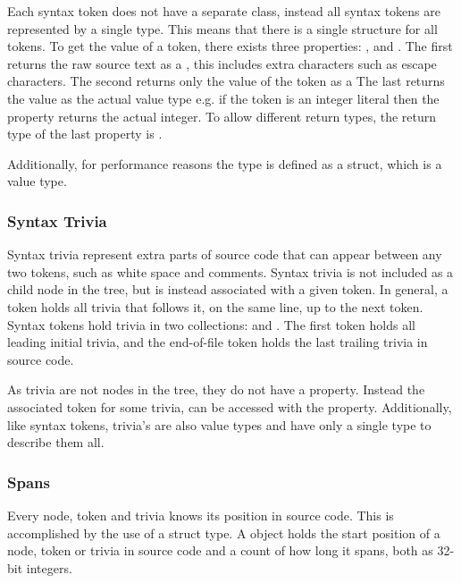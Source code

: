 Each syntax token does not have a separate class, instead all syntax tokens are represented by a single  type. This means that there is a single structure for all tokens. To get the value of a token, there exists three properties: ,  and . The first returns the raw source text as a , this includes extra characters such as escape characters. The second returns only the value of the token as a  The last returns the value as the actual value type e.g. if the token is an integer literal then the property returns the actual integer. To allow different return types, the return type of the last property is .

Additionally, for performance reasons the  type is defined as a struct, which is a value type\cite[p. 7]{ng2012roslyn}.

\subsubsection{Syntax Trivia}
Syntax trivia represent extra parts of source code that can appear between any two tokens, such as white space and comments. Syntax trivia is not included as a child node in the tree, but is instead associated with a given token. In general, a token holds all trivia that follows it, on the same line, up to the next token. Syntax tokens hold trivia in two collections:  and . The first token holds all leading initial trivia, and the end-of-file token holds the last trailing trivia in source code\cite[p. 8]{ng2012roslyn}.

As trivia are not nodes in the tree, they do not have a  property. Instead the associated token for some trivia, can be accessed with the  property. Additionally, like syntax tokens, trivia's are also value types and have only a single  type to describe them all.

\subsubsection{Spans}
Every node, token and trivia knows its position in source code. This is accomplished by the use of a  struct type. A  object holds the start position of a node, token or trivia in source code and a count of how long it spans, both as 32-bit integers\cite[p. 8]{ng2012roslyn}.

